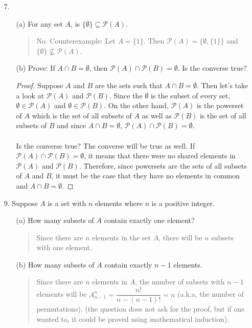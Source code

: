 \documentclass[12pt, a4paper]{article}                      %
\begin{document}
\begin{itemize}
\begin{itemize}
\item[]
\item[]

\item[7.]
\begin{itemize}
\item[(a)]
For any set $A$, is $\{\emptyset\} \subseteq \mathcal{P}(A)$.
\begin{quote}
No. Counterexample: Let $A = \{1\}$. Then $\mathcal{P}(A) = \{\emptyset, \{1\}\}$
and $\{\emptyset\} \nsubseteq \mathcal{P}(A)$.
\end{quote}
\item[]
\item[(b)]
Prove: If $A \cap B = \emptyset$, then $\mathcal{P}(A) \cap \mathcal{P}(B) = \emptyset$. Is the converse true?
\begin{proof}
Suppose $A$ and $B$ are the sets such that $A \cap B = \emptyset$. Then let's take a look
at $\mathcal{P}(A)$ and $\mathcal{P}(B)$. Since the $\emptyset$ is the subset of every set,
$\emptyset \in \mathcal{P}(A)$ and $\emptyset \in \mathcal{P}(B)$. On the other hand, $\mathcal{P}(A)$
is the powerset of $A$ which is the set of all subsets of $A$ as well as $\mathcal{P}(B)$ is the set
of all subsets of $B$ and since $A \cap B = \emptyset$, $\mathcal{P}(A) \cap \mathcal{P}(B) = \emptyset$.
\\\\
Is the converse true?
The converse will be true as well. If $\mathcal{P}(A) \cap \mathcal{P}(B) = \emptyset$, it means
that there were no shared elements in $\mathcal{P}(A)$ and $\mathcal{P}(B)$. Therefore, since
powersets are the sets of all subsets of $A$ and $B$, it must be the case that they have no elements
in common and $A \cap B = \emptyset$.
\end{proof}
\end{itemize}

\item[]
\item[]

\item[9.]
Suppose $A$ is a set with $n$ elements where $n$ is a positive integer.
\begin{itemize}
\item[(a)]
How many subsets of $A$ contain exactly one element?
\begin{quote}
Since there are $n$ elements in the set $A$, there will be $n$ subsets with one element.
\end{quote}
\item[]
\item[(b)]
How many subsets of $A$ contain exactly $n - 1$ elements.
\begin{quote}
Since there are $n$ elements in $A$, the number of subsets
with $n - 1$ elements will be $A_{n - 1}^n = \dfrac{n!}{n - (n - 1)!} = n$ (a.k.a, the number of permutations).
(the question does not ask for the proof, but if one wanted to, it could be proved
using mathematical induction).
\end{quote}
\end{itemize}
\end{itemize}

\end{itemize}
\end{document}
